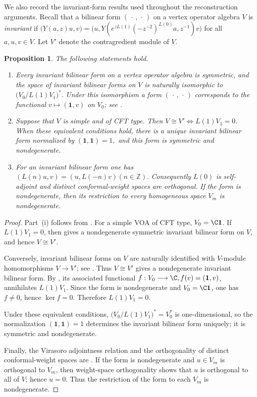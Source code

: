 \documentclass[12pt,leqno]{amsart}
\numberwithin{equation}{section} \newtheorem{thm}{Theorem}[section] \newtheorem{lem}[thm]{Lemma} \newtheorem{ex}[thm]{Example} \newtheorem{prop}[thm]{Proposition} \newtheorem{cor}[thm]{Corollary} \newtheorem{defi}[thm]{Definition} \newtheorem{rmk}[thm]{Remark} \newtheorem{notation}[thm]{Notation}
\newcommand{\one}{\mathbf{1}}
\begin{document}
We also record the invariant-form results used throughout the reconstruction arguments. Recall that a bilinear form $(\,\cdot\,,\,\cdot\,)$ on a vertex operator algebra $V$ is \emph{invariant} if \(\bigl(Y(a,z)u,v\bigr)=\bigl(u,Y(e^{zL(1)}(-z^{-2})^{L(0)}a,z^{-1})v\bigr)\) for all $a,u,v\in V$. Let $V'$ denote the contragredient module of $V$.

\begin{prop}
\label{prop:Li-invariant-package}
The following statements hold.
\begin{enumerate}[label=\textnormal{(\roman*)}]
\item Every invariant bilinear form on a vertex operator algebra is
symmetric, and the space of invariant bilinear forms on $V$ is naturally isomorphic to \(\bigl(V_0/L(1)V_1\bigr)^*.\) Under this isomorphism a form $(\,\cdot\,,\,\cdot\,)$ corresponds to the functional $v\mapsto(\one,v)$ on $V_0$; see \cite[Proposition~2.6 and Theorem~3.1]{LiInvariant}.

\item Suppose that $V$ is simple and of CFT type.  Then \(V\cong V'\Longleftrightarrow L(1)V_1=0.\)
When these equivalent conditions hold, there is a unique invariant bilinear form normalized by \((\one,\one)=1,\) and this form is symmetric and nondegenerate.

\item For an invariant bilinear form one has \((L(n)u,v)=(u,L(-n)v)(n\in\mathbb Z).\)
Consequently $L(0)$ is self-adjoint and distinct conformal-weight spaces are orthogonal. If the form is nondegenerate, then its restriction to every homogeneous space $V_m$ is nondegenerate.
\end{enumerate}
\end{prop}

\begin{proof}
Part~\textnormal{(i)} follows from \cite[Proposition~2.6 and Theorem~3.1]{LiInvariant}. For a simple VOA of CFT type, $V_0=\C\one$. If $L(1)V_1=0$, then \cite[Corollary~3.2]{LiInvariant} gives a nondegenerate symmetric invariant bilinear form on $V$, and hence $V\cong V'$.

Conversely, invariant bilinear forms on $V$ are naturally identified with $V$-module homomorphisms $V\to V'$; see \cite[p.~284]{LiInvariant}. Thus $V\cong V'$ gives a nondegenerate invariant bilinear form. By \cite[Theorem~3.1]{LiInvariant}, its associated functional \(f:V_0\longrightarrow\C, f(v)=(\one,v)\), annihilates $L(1)V_1$. Since the form is nondegenerate and $V_0=\C\one$, one has $f\ne0$, hence $\ker f=0$. Therefore $L(1)V_1=0$.

Under these equivalent conditions, \(\bigl(V_0/L(1)V_1\bigr)^*=V_0^*\) is one-dimensional, so the normalization $(\one,\one)=1$ determines the invariant bilinear form uniquely; it is symmetric and nondegenerate.

Finally, the Virasoro adjointness relation and the orthogonality of distinct conformal-weight spaces are \cite[(2.21)--(2.23)]{LiInvariant}. If the form is nondegenerate and $u\in V_m$ is orthogonal to $V_m$, then weight-space orthogonality shows that $u$ is orthogonal to all of $V$; hence $u=0$. Thus the restriction of the form to each $V_m$ is nondegenerate.
\end{proof}
\end{document}
